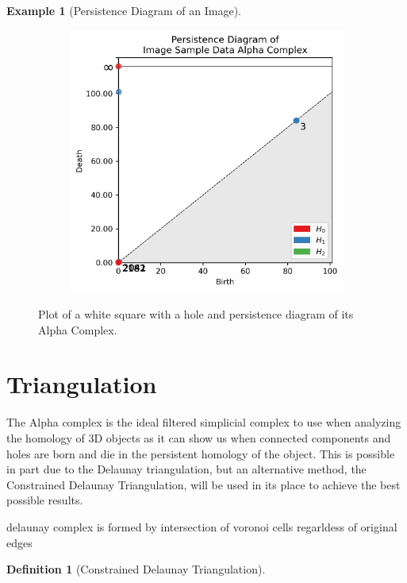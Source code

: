\documentclass[ma]{uncgdissertationexp}
\theoremstyle{plain}
\theoremstyle{definition}
\newtheorem{definition}[theorem]{Definition}
\newtheorem{example}[theorem]{Example}
\theoremstyle{remark}
\begin{document}
\begin{example}[Persistence Diagram of an Image]
\begin{figure}[H]
    \begin{subfigure}[b]{0.45\textwidth}
        \centering
        \includegraphics[width=\textwidth]{image_data_persdia.png}
    \end{subfigure}
    \caption{Plot of a white square with a hole and persistence diagram of its Alpha Complex.}
    \label{fig:image_data_persdia}
\end{figure}
\end{example}

\newpage
\section{Triangulation}
\par The Alpha complex is the ideal filtered simplicial complex to use when analyzing the homology of 3D objects as it can show us when connected components and holes are born and die in the persistent homology of the object. This is possible in part due to the Delaunay triangulation, but an alternative method, the Constrained Delaunay Triangulation, will be used in its place to achieve the best possible results.

delaunay complex is formed by intersection of voronoi cells regarldess of original edges

\begin{definition}[Constrained Delaunay Triangulation]
\label{def:cdt}
 \cite{chew1987constrained}
\end{definition}
\end{document}

